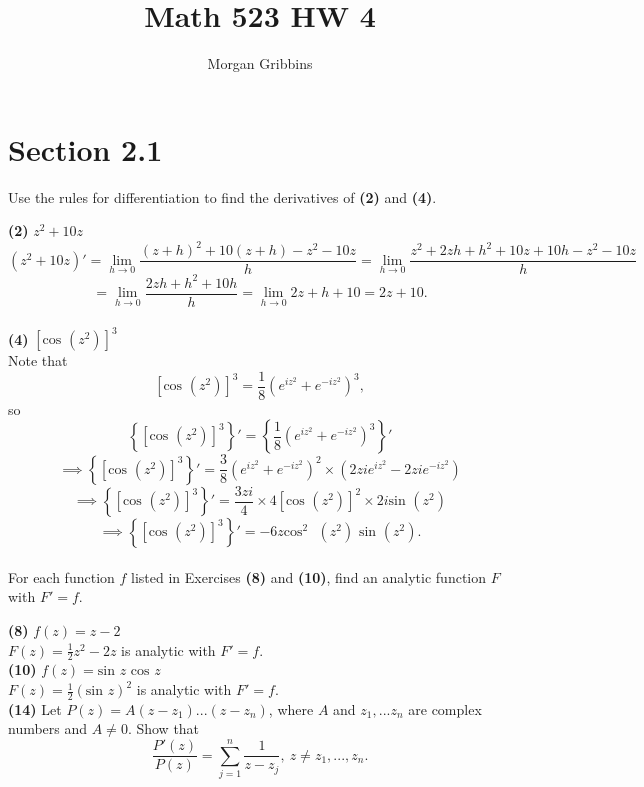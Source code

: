 \documentclass[12pt,letterpaper]{article}
\title{Math 523 HW 4}
\author{Morgan Gribbins}
\date{}
\begin{document}
	
\maketitle

\section*{Section 2.1}

Use the rules for differentiation to find the derivatives of \textbf{(2)} and \textbf{(4)}.

\textbf{(2)} \(z^{2} + 10z\) \\

\[(z^{2} + 10z)' = \lim_{h \to 0} \frac{(z+h)^{2} + 10(z+h) - z^{2} - 10z}{h} = \lim_{h \to 0} \frac{z^{2} +2zh + h^{2} + 10z + 10 h - z^{2} - 10 z}{h} \] \[= \lim_{h \to 0} \frac{2zh + h^{2} + 10h}{h} = \lim_{h \to 0} 2z + h + 10 = 2z + 10.\] \\

\textbf{(4)} \([\text{cos } (z^{2})]^{3}\) \\

Note that \[[\text{cos }(z^{2})]^{3} = \frac{1}{8} \left(e^{iz^{2}} + e^{-iz^{2}}\right)^{3},\] so \[\left\{[\text{cos }(z^{2})]^{3}\right\}' = \left\{\frac{1}{8} \left(e^{iz^{2}} + e^{-iz^{2}}\right)^{3}\right\}'\] \[\implies \left\{[\text{cos }(z^{2})]^{3}\right\}' = \frac{3}{8}\left(e^{iz^{2}} + e^{-iz^{2}}\right)^{2}\times \left(2zie^{iz^{2}} - 2zie^{-iz^{2}}\right)\] \[ \implies \left\{[\text{cos }(z^{2})]^{3}\right\}' = \frac{3zi}{4} \times 4[\text{cos }(z^{2})]^{2} \times 2i\text{sin }(z^{2}) \] \[ \implies \left\{[\text{cos }(z^{2})]^{3}\right\}' = -6z\text{cos}^{2}\text{ } (z^{2}) \text{ sin }(z^{2}). \] \\

For each function \(f\) listed in Exercises \textbf{(8)} and \textbf{(10)}, find an analytic function \(F\) with \(F' = f\).

\textbf{(8)} \(f(z) = z - 2\) \\

\(F(z) = \frac{1}{2}z^{2} -2 z\) is analytic with \(F' = f\). \\

\textbf{(10)} \(f(z) = \text{sin } z \text{ cos } z \) \\

\(F(z) = \frac{1}{2}\left(\text{sin } z\right)^{2}\) is analytic with \(F' = f\). \\

\textbf{(14)} Let \(P(z) = A(z - z_{1})...(z-z_{n})\), where \(A\) and \(z_{1},...z_{n}\) are complex numbers and \(A \neq 0\). Show that \[\frac{P'(z)}{P(z)} = \sum_{j=1}^{n}\frac{1}{z-z_{j}},\ z \neq z_{1},...,z_{n}.\] \\
\end{document}
